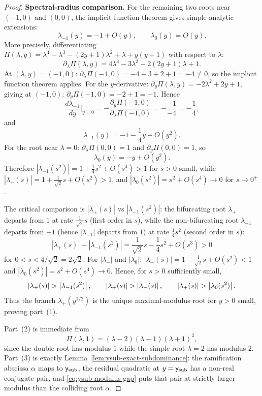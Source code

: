 \begin{proof}
\medskip
\noindent\textbf{Spectral-radius comparison.}
For the remaining two roots near $(-1,0)$ and $(0,0)$, the implicit function theorem gives simple analytic extensions:
\begin{equation}\label{eq:other-roots-local}
\lambda_{-1}(y) = -1 + O(y),
\qquad
\lambda_0(y) = O(y).
\end{equation}
More precisely, differentiating $\Pi(\lambda,y)=\lambda^4-\lambda^3-(2y+1)\lambda^2+\lambda+y(y+1)$ with respect to $\lambda$:
\[
\partial_\lambda\Pi(\lambda,y) = 4\lambda^3-3\lambda^2-2(2y+1)\lambda+1.
\]
At $(\lambda,y)=(-1,0)$: $\partial_\lambda\Pi(-1,0) = -4-3+2+1=-4\neq 0$, so the implicit function theorem applies.
For the $y$-derivative: $\partial_y\Pi(\lambda,y)=-2\lambda^2+2y+1$, giving at $(-1,0)$: $\partial_y\Pi(-1,0)=-2+1=-1$.
Hence
\[
\frac{d\lambda_{-1}}{dy}\bigg|_{y=0} = -\frac{\partial_y\Pi(-1,0)}{\partial_\lambda\Pi(-1,0)} = -\frac{-1}{-4} = -\frac{1}{4},
\]
and
\[
\lambda_{-1}(y) = -1 - \frac{1}{4}y + O(y^2).
\]
For the root near $\lambda=0$: $\partial_\lambda\Pi(0,0)=1$ and $\partial_y\Pi(0,0)=1$, so
\[
\lambda_0(y) = -y+O(y^2).
\]
Therefore $|\lambda_{-1}(s^2)|=1+\tfrac{1}{4}s^2+O(s^4)>1$ for $s>0$ small, while $|\lambda_+(s)|=1+\tfrac{1}{\sqrt{2}}s+O(s^2)>1$, and $|\lambda_0(s^2)|=s^2+O(s^4)\to 0$ for $s\to 0^+$.

The critical comparison is $|\lambda_+(s)|$ vs $|\lambda_{-1}(s^2)|$: the bifurcating root $\lambda_+$ departs from $1$ at rate $\tfrac{1}{\sqrt{2}}s$ (first order in $s$), while the non-bifurcating root $\lambda_{-1}$ departs from $-1$ (hence $|\lambda_{-1}|$ departs from $1$) at rate $\tfrac{1}{4}s^2$ (second order in $s$):
\[
|\lambda_+(s)| - |\lambda_{-1}(s^2)| = \frac{1}{\sqrt{2}}s - \frac{1}{4}s^2 + O(s^3) > 0
\]
for $0<s<4/\sqrt{2}=2\sqrt{2}$.
For $|\lambda_-|$ and $|\lambda_0|$: $|\lambda_-(s)|=1-\tfrac{1}{\sqrt{2}}s+O(s^2)<1$ and $|\lambda_0(s^2)|=s^2+O(s^4)\to 0$.
Hence, for $s>0$ sufficiently small,
\begin{equation}\label{eq:dominance-ineqs}
\left\lvert \lambda_+(s)\right\rvert
>
\left\lvert \lambda_{-1}(s^2)\right\rvert,
\qquad
\left\lvert \lambda_+(s)\right\rvert
>
\left\lvert \lambda_-(s)\right\rvert,
\qquad
\left\lvert \lambda_+(s)\right\rvert
>
\left\lvert \lambda_0(s^2)\right\rvert.
\end{equation}
Thus the branch $\lambda_+(y^{1/2})$ is the unique maximal-modulus root for $y>0$ small, proving part~(1).

Part~(2) is immediate from
\[
\Pi(\lambda,1)=(\lambda-2)(\lambda-1)(\lambda+1)^2,
\]
since the double root has modulus \(1\) while the simple root \(\lambda=2\) has modulus \(2\).
Part~(3) is exactly Lemma~\ref{lem:ysub-exact-subdominance}: the ramification abscissa \(\alpha\) maps to \(\mathsf{y}_{\mathrm{sub}}\), the residual quadratic at \(y=\mathsf{y}_{\mathrm{sub}}\) has a non-real conjugate pair, and \eqref{eq:ysub-modulus-gap} puts that pair at strictly larger modulus than the colliding root \(\alpha\).
\end{proof}

